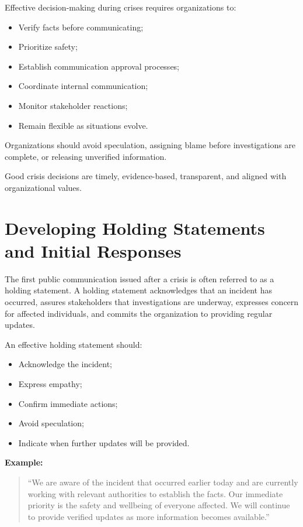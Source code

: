 \documentclass[10pt]{article}
\begin{document}
Effective decision-making during crises requires organizations to:
\begin{itemize}
    \item Verify facts before communicating;
    \item Prioritize safety;
    \item Establish communication approval processes;
    \item Coordinate internal communication;
    \item Monitor stakeholder reactions;
    \item Remain flexible as situations evolve.
\end{itemize}

Organizations should avoid speculation, assigning blame before investigations are complete, or releasing unverified information.

Good crisis decisions are timely, evidence-based, transparent, and aligned with organizational values.

\section*{Developing Holding Statements and Initial Responses}

The first public communication issued after a crisis is often referred to as a holding statement. A holding statement acknowledges that an incident has occurred, assures stakeholders that investigations are underway, expresses concern for affected individuals, and commits the organization to providing regular updates.

An effective holding statement should:
\begin{itemize}
    \item Acknowledge the incident;
    \item Express empathy;
    \item Confirm immediate actions;
    \item Avoid speculation;
    \item Indicate when further updates will be provided.
\end{itemize}

\textbf{Example:}
\begin{quote}
``We are aware of the incident that occurred earlier today and are currently working with relevant authorities to establish the facts. Our immediate priority is the safety and wellbeing of everyone affected. We will continue to provide verified updates as more information becomes available.''
\end{quote}
\end{document}
